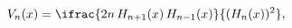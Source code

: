 \[V_{n}(x)=\ifrac{2n\mathop{H_{n+1}\/}\nolimits\!\left(x\right)\mathop{H_{n-1}\/%
}\nolimits\!\left(x\right)}{(\mathop{H_{n}\/}\nolimits\!\left(x\right))^{2}},\]